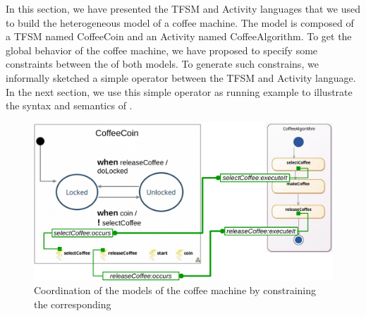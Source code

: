 In this section, we have presented the TFSM and Activity languages that we used to build the heterogeneous model of a coffee machine. The model is composed of a TFSM named CoffeeCoin and an Activity named CoffeeAlgorithm. To get the global behavior of the coffee machine, we have proposed to specify some constraints between the \mse of both models. To generate such constrains, we informally sketched a simple \bcool operator between the TFSM and Activity language. In the next section, we use this simple operator as running example to illustrate the syntax and semantics of \bcool. 

  
	\begin{figure}[h]
		\begin{center}
			\includegraphics[width=1\textwidth]{bcool/figs/tfsmandadcoord}
			\caption{Coordination of the models of the coffee machine by constraining the corresponding \mse}
			\label{fig:tfsmandadcoord}
		\end{center}
	\end{figure}

